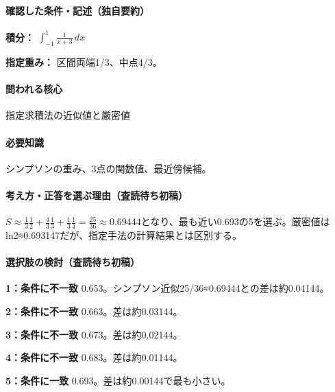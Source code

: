 \paragraph{確認した条件・記述（独自要約）}\mbox{}\par

\noindent\textbf{積分：} \(\int_{-1}^{1}\frac{1}{x+3}\,dx\)\par

\noindent\textbf{指定重み：} 区間両端1/3、中点4/3。\par

\paragraph{問われる核心} 指定求積法の近似値と厳密値

\paragraph{必要知識} シンプソンの重み、3点の関数値、最近傍候補。

\paragraph{考え方・正答を選ぶ理由（査読待ち初稿）} \(S\approx\frac13\frac12+\frac43\frac13+\frac13\frac14=\frac{25}{36}\approx0.69444\)となり、最も近い0.693の5を選ぶ。厳密値はln2≈0.693147だが、指定手法の計算結果とは区別する。

\paragraph{選択肢の検討（査読待ち初稿）}\mbox{}\par

\noindent\textbf{1：条件に不一致} 0.653。シンプソン近似25/36≈0.69444との差は約0.04144。\par

\noindent\textbf{2：条件に不一致} 0.663。差は約0.03144。\par

\noindent\textbf{3：条件に不一致} 0.673。差は約0.02144。\par

\noindent\textbf{4：条件に不一致} 0.683。差は約0.01144。\par

\noindent\textbf{5：条件に一致} 0.693。差は約0.00144で最も小さい。\par

